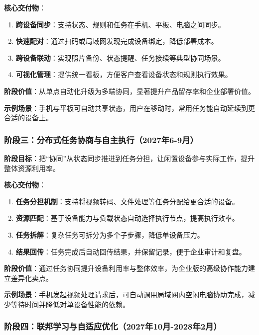\documentclass[12pt,a4paper]{article}
\begin{document}
\textbf{核心交付物}：

\begin{enumerate}
  \item \textbf{跨设备同步}：支持状态、规则和任务在手机、平板、电脑之间同步。
  \item \textbf{快速配对}：通过扫码或局域网发现完成设备绑定，降低部署成本。
  \item \textbf{跨设备联动}：实现照片备份、状态提醒、任务接续等典型协同场景。
  \item \textbf{可视化管理}：提供统一看板，方便客户查看设备状态和规则执行效果。
\end{enumerate}

\textbf{阶段价值}：从单点自动化升级为多端协同，显著提升产品留存率和企业部署价值。

\textbf{示例场景}：手机与平板可自动共享状态，用户在移动时，常用任务能自动延续到更合适的设备上。

\subsubsection{阶段三：分布式任务协商与自主执行（2027年6-9月）}

\textbf{阶段目标}：把“协同”从状态同步推进到任务分担，让闲置设备参与实际工作，提升整体资源利用率。

\textbf{核心交付物}：

\begin{enumerate}
  \item \textbf{任务分担机制}：支持将视频转码、文件处理等任务分配给更合适的设备。
  \item \textbf{资源匹配}：基于设备能力与负载状态自动选择执行节点，提高执行效率。
  \item \textbf{任务拆解}：复杂任务可拆分为多个子步骤，降低单设备压力。
  \item \textbf{结果回传}：任务完成后自动回传结果，并保留记录，便于企业审计和复盘。
\end{enumerate}

\textbf{阶段价值}：通过任务协同提升设备利用率与整体效率，为企业版的高级协作能力建立差异化卖点。

\textbf{示例场景}：手机发起视频处理请求后，可自动调用局域网内空闲电脑协助完成，减少等待时间并降低对单设备性能的依赖。

\subsubsection{阶段四：联邦学习与自适应优化（2027年10月-2028年2月）}
\end{document}
